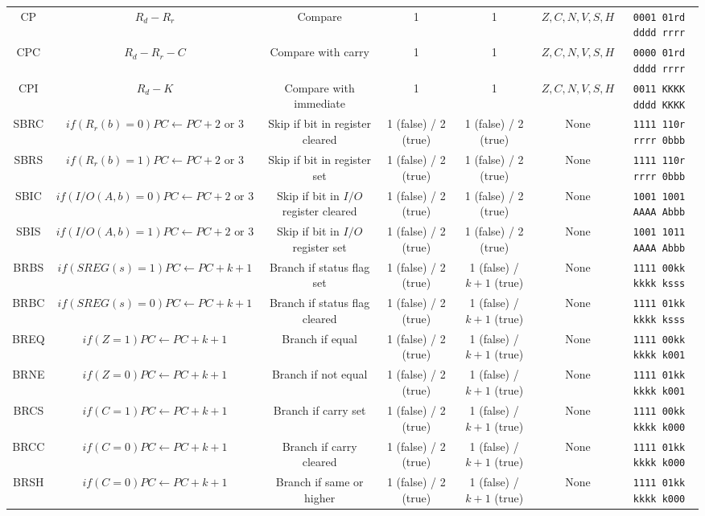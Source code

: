 \documentclass[11pt]{article}
\begin{document}
\begin{center}
\begin{longtable}{|c|c|c|c|c|c|c|}
CP & $R_d - R_r$ & Compare & 1 & 1 & $Z, C, N, V, S, H$ & \texttt{0001 01rd dddd rrrr}\\
CPC & $ R_d - R_r - C$ & Compare with carry & 1 & 1 & $Z, C, N, V, S, H$ & \texttt{0000 01rd dddd rrrr}\\
CPI & $R_d - K$ & Compare with immediate & 1 & 1 & $Z, C, N, V, S, H$ & \texttt{0011 KKKK dddd KKKK}\\
SBRC & $if(R_r(b) = 0) PC \leftarrow PC + 2 \text{ or } 3$ & Skip if bit in register cleared & 1 (false) / 2 (true) & 1 (false) / 2 (true) & None & \texttt{1111 110r rrrr 0bbb}\\
SBRS & $if(R_r(b) = 1) PC \leftarrow PC + 2 \text{ or } 3$ & Skip if bit in register set & 1 (false) / 2 (true) & 1 (false) / 2 (true) & None & \texttt{1111 110r rrrr 0bbb}\\
SBIC & $if(I/O(A, b) = 0) PC \leftarrow PC + 2 \text{ or } 3$ & Skip if bit in $I/O$ register cleared & 1 (false) / 2 (true) & 1 (false) / 2 (true) & None & \texttt{1001 1001 AAAA Abbb}\\
SBIS & $if(I/O(A, b) = 1) PC \leftarrow PC +2 \text{ or } 3$ & Skip if bit in $I/O$ register set & 1 (false) / 2 (true) & 1 (false) / 2 (true) & None & \texttt{1001 1011 AAAA Abbb}\\
BRBS & $if(SREG(s) = 1) PC \leftarrow PC + k + 1$ & Branch if status flag set & 1 (false) / 2 (true) & 1 (false) / $k + 1$ (true) & None & \texttt{1111 00kk kkkk ksss}\\
BRBC & $if(SREG(s) = 0) PC \leftarrow PC + k + 1$ & Branch if status flag cleared & 1 (false) / 2 (true) & 1 (false) / $k+1$ (true) & None & \texttt{1111 01kk kkkk ksss}\\
BREQ & $if(Z = 1) PC \leftarrow PC + k + 1$ & Branch if equal & 1 (false) / 2 (true) & 1 (false) / $k+1$ (true) & None & \texttt{1111 00kk kkkk k001}\\
BRNE & $if(Z = 0) PC \leftarrow PC + k + 1$ & Branch if not equal & 1 (false) / 2 (true) & 1 (false) / $k+1$ (true) & None & \texttt{1111 01kk kkkk k001}\\
BRCS & $if(C = 1) PC \leftarrow PC + k + 1$ & Branch if carry set & 1 (false) / 2 (true) & 1 (false) / $k+1$ (true) & None & \texttt{1111 00kk kkkk k000}\\
BRCC & $if(C = 0) PC \leftarrow PC + k + 1$ & Branch if carry cleared & 1 (false) / 2 (true) & 1 (false) / $k+1$ (true) & None & \texttt{1111 01kk kkkk k000}\\
BRSH & $if(C = 0) PC \leftarrow PC + k + 1$ & Branch if same or higher & 1 (false) / 2 (true) & 1 (false) / $k+1$ (true) & None & \texttt{1111 01kk kkkk k000}\\

\end{longtable}
\end{center}
\end{document}
